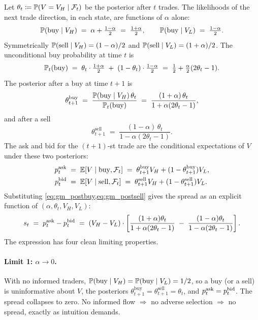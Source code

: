 Let $\theta_t \coloneqq \mathbb{P}(V = V_H \mid \mathcal{F}_t)$ be the
posterior after $t$ trades. The likelihoods of the next trade
direction, in each state, are functions of $\alpha$ alone:
\[
  \mathbb{P}(\text{buy} \mid V_H) \;=\; \alpha + \tfrac{1-\alpha}{2}
  \;=\; \tfrac{1 + \alpha}{2},
  \qquad
  \mathbb{P}(\text{buy} \mid V_L) \;=\; \tfrac{1-\alpha}{2}.
\]
Symmetrically $\mathbb{P}(\text{sell} \mid V_H) = (1 - \alpha)/2$ and
$\mathbb{P}(\text{sell} \mid V_L) = (1 + \alpha)/2$. The unconditional
buy probability at time $t$ is
\begin{equation}
  \mathbb{P}_t(\text{buy}) \;=\;
     \theta_t \cdot \tfrac{1 + \alpha}{2}
     \;+\; (1 - \theta_t) \cdot \tfrac{1 - \alpha}{2}
     \;=\; \tfrac{1}{2} + \tfrac{\alpha}{2}(2\theta_t - 1).
  \label{eq:gm_pbuy}
\end{equation}
The posterior after a buy at time $t+1$ is
\begin{equation}
  \theta_{t+1}^{\text{buy}}
  \;=\; \frac{\mathbb{P}(\text{buy} \mid V_H)\,\theta_t}{\mathbb{P}_t(\text{buy})}
  \;=\; \frac{(1 + \alpha)\,\theta_t}{1 + \alpha (2\theta_t - 1)},
  \label{eq:gm_postbuy}
\end{equation}
and after a sell
\begin{equation}
  \theta_{t+1}^{\text{sell}}
  \;=\; \frac{(1 - \alpha)\,\theta_t}{1 - \alpha (2\theta_t - 1)}.
  \label{eq:gm_postsell}
\end{equation}
The ask and bid for the $(t+1)$-st trade are the conditional
expectations of $V$ under these two posteriors:
\begin{align}
  p^{\mathrm{ask}}_t \;&=\; \mathbb{E}[V \mid \text{buy}, \mathcal{F}_t]
         \;=\; \theta_{t+1}^{\text{buy}} V_H + (1 - \theta_{t+1}^{\text{buy}}) V_L, \label{eq:gm_ask} \\
  p^{\mathrm{bid}}_t \;&=\; \mathbb{E}[V \mid \text{sell}, \mathcal{F}_t]
         \;=\; \theta_{t+1}^{\text{sell}} V_H + (1 - \theta_{t+1}^{\text{sell}}) V_L. \label{eq:gm_bid}
\end{align}
Substituting \cref{eq:gm_postbuy,eq:gm_postsell} gives the spread
as an explicit function of $(\alpha, \theta_t, V_H, V_L)$:
\begin{equation}
  s_t
  \;=\; p^{\mathrm{ask}}_t - p^{\mathrm{bid}}_t
  \;=\; (V_H - V_L) \cdot
     \left[
       \frac{(1+\alpha)\theta_t}{1 + \alpha(2\theta_t - 1)}
       \;-\;
       \frac{(1-\alpha)\theta_t}{1 - \alpha(2\theta_t - 1)}
     \right].
  \label{eq:gm_spread_full}
\end{equation}
The expression has four clean limiting properties.

\paragraph{Limit 1: $\alpha \to 0$.} With no informed traders,
$\mathbb{P}(\text{buy} \mid V_H) = \mathbb{P}(\text{buy} \mid V_L) = 1/2$,
so a buy (or a sell) is uninformative about $V$, the posteriors
$\theta_{t+1}^{\text{buy}} = \theta_{t+1}^{\text{sell}} = \theta_t$,
and $p^{\mathrm{ask}}_t = p^{\mathrm{bid}}_t$. The spread collapses to zero. No informed
flow $\Rightarrow$ no adverse selection $\Rightarrow$ no spread,
exactly as intuition demands.


